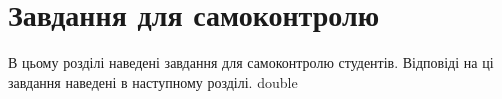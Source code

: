 \chapter{Завдання для самоконтролю}
В цьому розділі наведені завдання для самоконтролю студентів. Відповіді на ці завдання наведені в наступному розділі.
{double}
